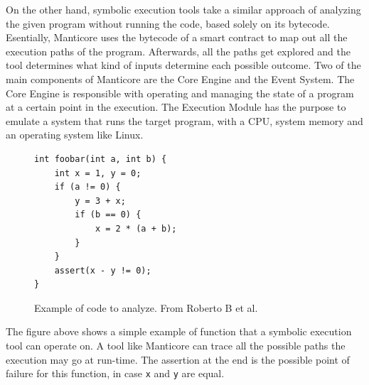 On the other hand, symbolic execution tools \cite{symbolicExecutionDef} take a similar approach of analyzing the given program without running the code, based solely on its bytecode. Esentially, Manticore \cite{manticore} uses the bytecode of a smart contract to map out all the execution paths of the program. Afterwards, all the paths get explored and the tool determines what kind of inputs determine each possible outcome. Two of the main components of Manticore are the Core Engine and the Event System. The Core Engine is responsible with operating and managing the state of a program at a certain point in the execution. The Execution Module has the purpose to emulate a system that runs the target program, with a CPU, system memory and an operating system like Linux.

\begin{figure}[H]
\centering
\begin{BVerbatim}
int foobar(int a, int b) {
    int x = 1, y = 0;
    if (a != 0) {
        y = 3 + x;
        if (b == 0) {
            x = 2 * (a + b);
        }
    }
    assert(x - y != 0);
}
\end{BVerbatim}
\caption{Example of code to analyze. From Roberto B et al. \cite{symbolicExecutionDef}}
\end{figure}

The figure above shows a simple example of function that a symbolic execution tool can operate on. A tool like Manticore can trace all the possible paths the execution may go at run-time. The assertion at the end is the possible point of failure for this function, in case \texttt{x} and \texttt{y} are equal.

